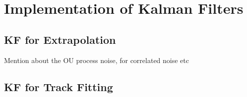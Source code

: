 \section{Implementation of Kalman Filters}
\label{gnn-kf-implementation}

\subsection{KF for Extrapolation}
Mention about the OU process noise, for correlated noise etc

\subsection{KF for Track Fitting}


